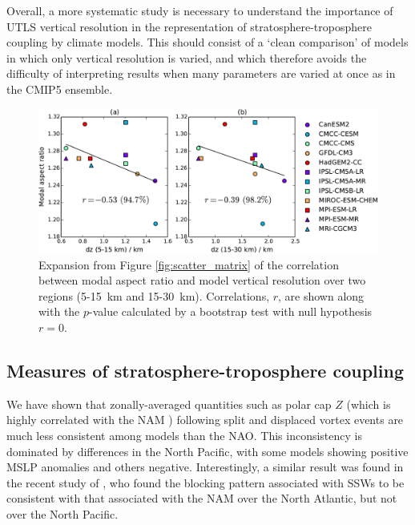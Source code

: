 Overall, a more systematic study is necessary to understand the importance of
UTLS vertical resolution in the representation of stratosphere-troposphere
coupling by climate models. This should consist of a `clean comparison' of
models in which only vertical resolution is varied, and which therefore avoids
the difficulty of interpreting results when many parameters are varied at once
as in the CMIP5 ensemble.




\begin{figure}
 \centering
 \noindent\includegraphics[width=\textwidth]{figures/chapter-models/aspect_ratio_resolution.pdf}
 \caption[Vertical resolution and modal aspect ratio.]{Expansion from Figure
   \ref{fig:scatter_matrix} of the correlation between modal aspect ratio and
   model vertical resolution over two regions (5-15~km and
   15-30~km). Correlations, $r$, are shown along with the $p$-value calculated by a
   bootstrap test with null hypothesis $r=0$.}
 \label{fig:aspect_vert_res}
\end{figure}


\subsection{Measures of stratosphere-troposphere coupling}
\label{sec:meas-strat-trop}

We have shown that zonally-averaged quantities such as polar cap $Z$ (which is
highly correlated with the NAM \citep{Kushner2010}) following split and
displaced vortex events are much less consistent among models than the NAO. This
inconsistency is dominated by differences in the North Pacific, with some models
showing positive MSLP anomalies and others negative. Interestingly, a similar
result was found in the recent study of \citet{Davini2014}, who found the
blocking pattern associated with SSWs to be consistent with that associated with
the NAM over the North Atlantic, but not over the North Pacific. 

